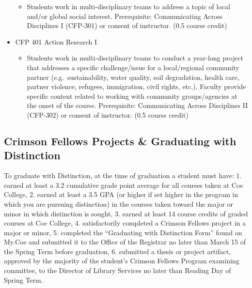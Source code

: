 \documentclass[
  letterpaper,
]{scrbook}
\providecommand{\tightlist}{%
  \setlength{\itemsep}{0pt}\setlength{\parskip}{0pt}}
\begin{document}
\begin{itemize}
  \begin{itemize}
  \tightlist
  \item
    Students work in multi-disciplinary teams to address a topic of
    local and/or global social interest. Prerequisite: Communicating
    Across Disciplines I (CFP-301) or consent of instructor. (0.5 course
    credit)
  \end{itemize}
\item
  CFP 401 Action Research I

  \begin{itemize}
  \tightlist
  \item
    Students work in multi-disciplinary teams to conduct a year-long
    project that addresses a specific challenge/issue for a
    local/regional community partner (e.g.~sustainability, water
    quality, soil degradation, health care, partner violence, refugees,
    immigration, civil rights, etc.). Faculty provide specific content
    related to working with community groups/agencies at the onset of
    the course. Prerequisite: Communicating Across Disciplines II
    (CFP-302) or consent of instructor. (0.5 course credit)
  \end{itemize}
\end{itemize}

\hypertarget{crimson-fellows-projects-graduating-with-distinction}{%
\subsection{Crimson Fellows Projects \& Graduating with
Distinction}\label{crimson-fellows-projects-graduating-with-distinction}}

To graduate with Distinction, at the time of graduation a student must
have: 1. earned at least a 3.2 cumulative grade point average for all
courses taken at Coe College, 2. earned at least a 3.5 GPA (or higher if
set higher in the program in which you are pursuing distinction) in the
courses taken toward the major or minor in which distinction is sought,
3. earned at least 14 course credits of graded courses at Coe College,
4. satisfactorily completed a Crimson Fellows project in a major or
minor, 5. completed the ``Graduating with Distinction Form'' found on
My.Coe and submitted it to the Office of the Registrar no later than
March 15 of the Spring Term before graduation, 6. submitted a thesis or
project artifact, approved by the majority of the student's Crimson
Fellows Program examining committee, to the Director of Library Services
no later than Reading Day of Spring Term.
\end{document}

